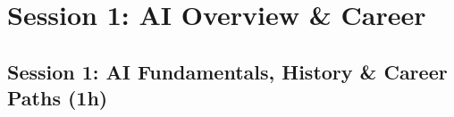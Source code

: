 %
%
%


\section[AI Overview]{Session 1: AI Overview \& Career}

\subsection*{Session 1: AI Fundamentals, History \& Career Paths (1h)}



